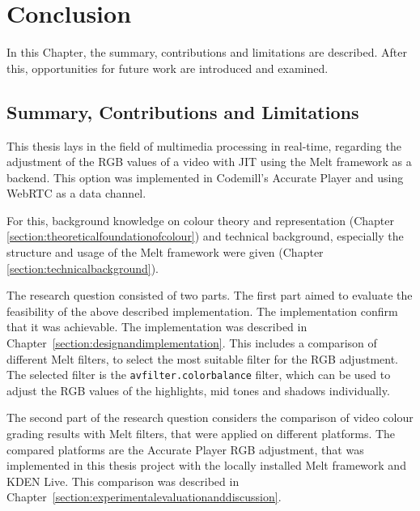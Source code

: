 \documentclass[../MasterThesis.tex]{subfiles}
\begin{document}
	
	
%
%
%
%
%
%
%
%
\newpage
\section{Conclusion} \label{section:conclusion}

In this Chapter, the summary, contributions and limitations are described. After this, opportunities for future work are introduced and examined.






\subsection{Summary, Contributions and Limitations} \label{subsection:summary}

This thesis lays in the field of multimedia processing in real-time, regarding the adjustment of the RGB values of a video with JIT using the Melt framework as a backend. This option was implemented in Codemill's Accurate Player and using WebRTC as a data channel.

For this, background knowledge on colour theory and representation (Chapter \ref{section:theoreticalfoundationofcolour}) and technical background, especially the structure and usage of the Melt framework were given (Chapter \ref{section:technicalbackground}).

The research question consisted of two parts. The first part aimed to evaluate the feasibility of the above described implementation. The implementation confirm that it was achievable. The implementation was described in Chapter~\ref{section:designandimplementation}. This includes a comparison of different Melt filters, to select the most suitable filter for the RGB adjustment. The selected filter is the \texttt{avfilter.colorbalance} filter, which can be used to adjust the RGB values of the highlights, mid tones and shadows individually.


The second part of the research question considers the comparison of video colour grading results with Melt filters, that were applied on different platforms. The compared platforms are the Accurate Player RGB adjustment, that was implemented in this thesis project with the locally installed Melt framework and KDEN Live. This comparison was described in Chapter~\ref{section:experimentalevaluationanddiscussion}.
\end{document}
